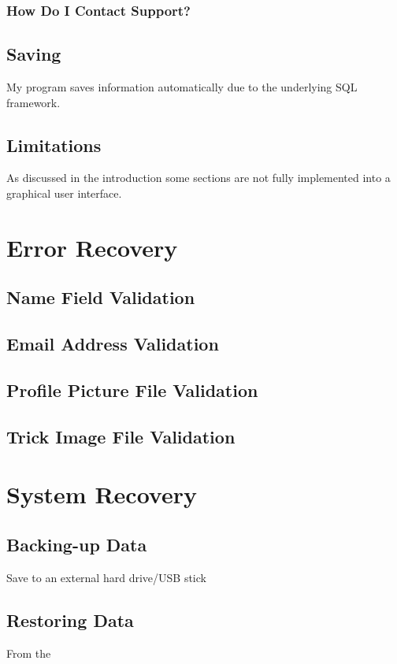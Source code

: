 



\subsubsection{How Do I Contact Support?}

\subsection{Saving}

My program saves information automatically due to the underlying SQL framework.

\subsection{Limitations}

As discussed in the introduction some sections are not fully implemented into a graphical user interface.

\section{Error Recovery}

\subsection{Name Field Validation}

\subsection{Email Address Validation}

\subsection{Profile Picture File Validation}

\subsection{Trick Image File Validation}






\section{System Recovery}

\subsection{Backing-up Data}

Save to an external hard drive/USB stick

\subsection{Restoring Data}

From the